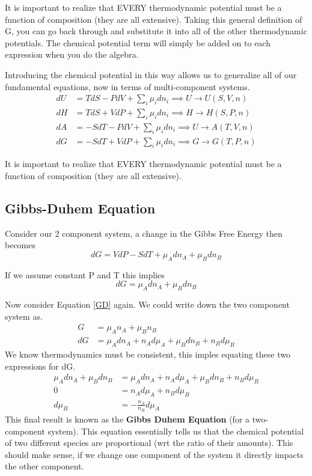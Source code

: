 \documentclass{article}
\newcommand{\be}{\begin{equation}}
\newcommand{\ee}{\end{equation}}
\begin{document}
It is important to realize that EVERY thermodynamic potential must be a function of composition (they are all extensive). 
Taking this general definition of G, you can go back through and substitute it into all of the other thermodynamic potentials.
The chemical potential term will simply be added on to each expression when you do the algebra. 

Introducing the chemical potential in this way allows us to generalize all of our fundamental equations, now in terms of multi-component systems. 
\begin{equation}
\begin{split}
    dU &= TdS - PdV + \sum_i\mu_i dn_i \implies U\rightarrow U(S,V,n) \\
    dH &= TdS + VdP + \sum_i\mu_i dn_i \implies H\rightarrow H(S,P,n)\\
    dA &= -SdT - PdV + \sum_i\mu_i dn_i \implies U\rightarrow A(T,V,n)\\
    dG &= -SdT + VdP + \sum_i\mu_i dn_i \implies G\rightarrow G(T,P,n)
\end{split}
\end{equation}

It is important to realize that EVERY thermodynamic potential must be a function of composition (they are all extensive). 

\subsection*{Gibbs-Duhem Equation}
Consider our 2 component system, a change in the Gibbs Free Energy then becomes
\be
dG = VdP - SdT + \mu_Adn_A + \mu_B dn_B
\ee

If we assume constant P and T this implies
\be
dG = \mu_A dn_A + \mu_B dn_B
\ee

Now consider Equation \ref{GD} again. 
We could write down the two component system as.
\be
\begin{split}
G &= \mu_A n_A + \mu_B n_B\\
dG &= \mu_A dn_A + n_A d\mu_A + \mu_B dn_B + n_B d\mu_B
\end{split}
\ee
We know thermodynamics must be consistent, this imples equating these two expressions for dG. 
\be
\begin{split}
\mu_A dn_A + \mu_B dn_B &= \mu_A dn_A + n_A d\mu_A + \mu_B dn_B + n_B d\mu_B \\
0 &= n_A d\mu_A + n_B d\mu_B\\
d\mu_B &= -\frac{n_A}{n_B}d\mu_A
\end{split}
\ee
This final result is known as the \textbf{Gibbs Duhem Equation} (for a two-component system). 
This equation essentially tells us that the chemical potential of two different species are proportional (wrt the ratio of their amounts). 
This should make sense, if we change one component of the system it directly impacts the other component. 
\end{document}
